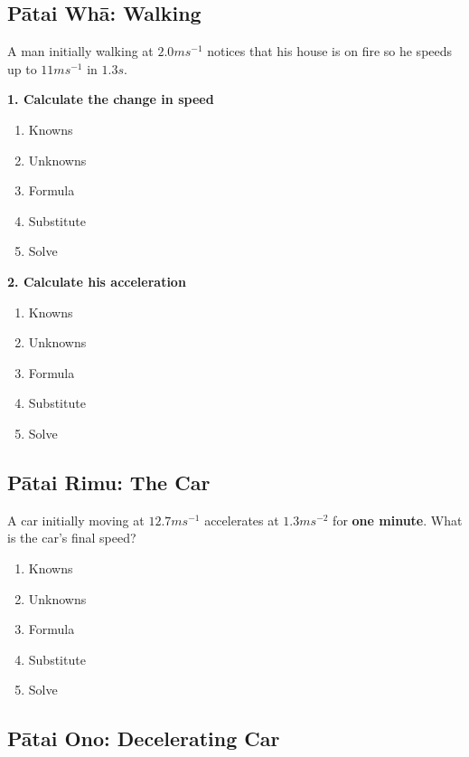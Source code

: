 \documentclass{report}
\begin{document}
\subsection{Pātai Whā: Walking}

A man initially walking at $2.0ms^{-1}$ notices that his house is on fire so he speeds up to $11ms^{-1}$ in $1.3s$.

\textbf{1. Calculate the change in speed}

\begin{enumerate}
\item Knowns
\item Unknowns
\item Formula 
\item Substitute
\item Solve
\end{enumerate}

\vspace {3cm}


\textbf{2. Calculate his acceleration}

\begin{enumerate}
\item Knowns
\item Unknowns
\item Formula 
\item Substitute
\item Solve
\end{enumerate}

\vspace {3cm}

\subsection{Pātai Rimu: The Car}

A car initially moving at $12.7ms^{-1}$ accelerates at $1.3ms^{-2}$ for \textbf{one minute}. What is the car's final speed?

\begin{enumerate}
\item Knowns
\item Unknowns
\item Formula 
\item Substitute
\item Solve
\end{enumerate}

\vspace{3cm}

\subsection{Pātai Ono: Decelerating Car}
\end{document}
